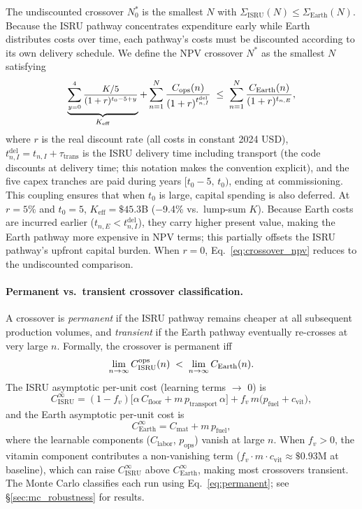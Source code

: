 \documentclass[5p,twocolumn]{elsarticle}
\begin{document}
The undiscounted crossover $N^*_0$ is the smallest $N$ with $\Sigma_{\mathrm{ISRU}}(N) \leq \Sigma_{\mathrm{Earth}}(N)$. Because the ISRU pathway concentrates expenditure early while Earth distributes costs over time, each pathway's costs must be discounted according to its own delivery schedule. We define the NPV crossover $N^*$ as the smallest $N$ satisfying
\begin{equation}\small
  \underbrace{\sum_{y=0}^{4} \frac{K/5}{(1+r)^{t_0 - 5 + y}}}_{K_{\mathrm{eff}}} + \sum_{n=1}^{N} \frac{C_{\mathrm{ops}}(n)}{(1+r)^{t_{n,I}^{\mathrm{del}}}} \;\leq\; \sum_{n=1}^{N} \frac{C_{\mathrm{Earth}}(n)}{(1+r)^{t_{n,E}}},
  \label{eq:crossover_npv}
\end{equation}
where $r$ is the real discount rate (all costs in constant 2024 USD), $t_{n,I}^{\mathrm{del}} = t_{n,I} + \tau_{\mathrm{trans}}$ is the ISRU delivery time including transport (the code discounts at delivery time; this notation makes the convention explicit), and the five capex tranches are paid during years $[t_0 - 5,\, t_0)$, ending at commissioning. This coupling ensures that when $t_0$ is large, capital spending is also deferred. At $r = 5\%$ and $t_0 = 5$, $K_{\mathrm{eff}} = \$45.3$B ($-$9.4\% vs.\ lump-sum $K$). Because Earth costs are incurred earlier ($t_{n,E} < t_{n,I}^{\mathrm{del}}$), they carry higher present value, making the Earth pathway more expensive in NPV terms; this partially offsets the ISRU pathway's upfront capital burden. When $r = 0$, Eq.~\ref{eq:crossover_npv} reduces to the undiscounted comparison.

\paragraph{Permanent vs.\ transient crossover classification.} A crossover is \emph{permanent} if the ISRU pathway remains cheaper at all subsequent production volumes, and \emph{transient} if the Earth pathway eventually re-crosses at very large $n$. Formally, the crossover is permanent iff
\begin{equation}\footnotesize
  \lim_{n \to \infty} C_{\mathrm{ISRU}}^{\mathrm{ops}}(n) \;<\; \lim_{n \to \infty} C_{\mathrm{Earth}}(n).
  \label{eq:permanent}
\end{equation}
The ISRU asymptotic per-unit cost (learning terms $\to$ 0) is
\[
  C_{\mathrm{ISRU}}^{\infty} = (1 - f_v)\bigl[\alpha \, C_{\mathrm{floor}} + m \, p_{\mathrm{transport}} \, \alpha\bigr] + f_v \, m \bigl(p_{\mathrm{fuel}} + c_{\mathrm{vit}}\bigr),
\]
and the Earth asymptotic per-unit cost is
\[
  C_{\mathrm{Earth}}^{\infty} = C_{\mathrm{mat}} + m \, p_{\mathrm{fuel}},
\]
where the learnable components ($C_{\mathrm{labor}}$, $p_{\mathrm{ops}}$) vanish at large $n$. When $f_v > 0$, the vitamin component contributes a non-vanishing term ($f_v \cdot m \cdot c_{\mathrm{vit}} \approx \$0.93$M at baseline), which can raise $C_{\mathrm{ISRU}}^{\infty}$ above $C_{\mathrm{Earth}}^{\infty}$, making most crossovers transient. The Monte Carlo classifies each run using Eq.~\ref{eq:permanent}; see \S\ref{sec:mc_robustness} for results.
\end{document}
